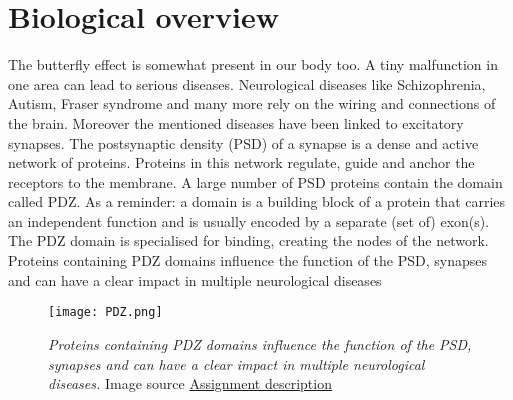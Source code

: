 \chapter*{Biological overview}
The butterfly effect is somewhat present in our body too. A tiny malfunction in one area can lead to
serious diseases. Neurological diseases like Schizophrenia, Autism, Fraser syndrome and many more
rely on the wiring and connections of the brain. Moreover the mentioned diseases have been linked to
excitatory synapses. The postsynaptic density (PSD) of a synapse is a dense and active network of
proteins. Proteins in this network regulate, guide and anchor the receptors to the membrane. A large
number of PSD proteins contain the domain called PDZ. As a reminder: a domain is a building block of
a protein that carries an independent function and is usually encoded by a separate (set of) exon(s). The
PDZ domain is specialised for binding, creating the nodes of the network. Proteins containing PDZ
domains  influence the  function  of the PSD, synapses  and can  have a  clear  impact in multiple
neurological diseases
\begin{figure}
\centering
\texttt{[image: PDZ.png]}
\caption{\emph{Proteins containing PDZ
domains  influence the  function  of the PSD, synapses  and can  have a  clear  impact in multiple
neurological diseases.}
Image source \href{https://wiki.itk.ppke.hu/twiki/pub/PPKE/BevBioInfo2016/bioinfo_p2016.pdf}{Assignment description}
%
}
\end{figure}
